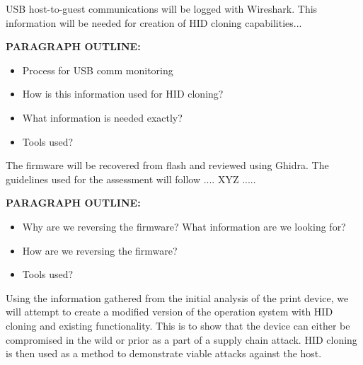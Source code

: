 
USB host-to-guest communications will be logged with Wireshark. This information will be needed for creation of HID cloning capabilities...

\textbf{PARAGRAPH OUTLINE:}
\begin{itemize}
  \item Process for USB comm monitoring
  \item How is this information used for HID cloning?
  \item What information is needed exactly?
  \item Tools used?
\end{itemize}


The firmware will be recovered from flash and reviewed using Ghidra. The guidelines used for the assessment will follow .... XYZ .....

\textbf{PARAGRAPH OUTLINE:}
\begin{itemize}
  \item Why are we reversing the firmware? What information are we looking for?
  \item How are we reversing the firmware?
  \item Tools used?
\end{itemize}


Using the information gathered from the initial analysis of the print device, we will attempt to create a modified version of the operation system with HID cloning and existing functionality. This is to show that the device can either be compromised in the wild or prior as a part of a supply chain attack. HID cloning is then used as a method to demonstrate viable attacks against the host. 



